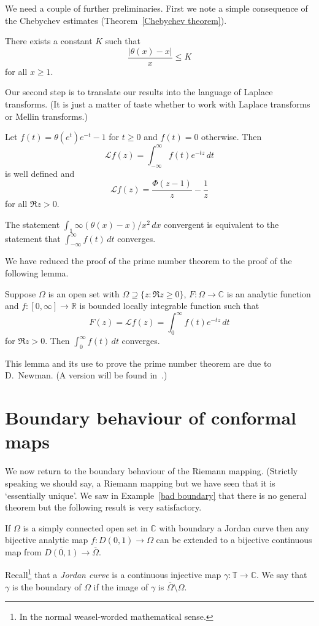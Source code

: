 We need a couple of further preliminaries.
First we note a simple consequence of the Chebychev
estimates (Theorem~\ref{Chebychev theorem}).
\begin{lemma} There exists a constant $K$
such that
\[\frac{|\theta(x)-x|}{x}\leq K\]
for all $x\geq 1$.
\end{lemma}
Our second step is to translate our results into
the language of Laplace transforms. (It is 
just a matter of taste whether to work with Laplace
transforms or Mellin transforms.)
\begin{lemma} Let $f(t)=\theta(e^{t})e^{-t}-1$ for
$t\geq 0$ and $f(t)=0$ otherwise. Then
\[\mathcal{L}f(z)=\int_{-\infty}^{\infty}f(t)e^{-tz}\,dt\]
is well defined and 
\[\mathcal{L}f(z)=\frac{\Phi(z-1)}{z}-\frac{1}{z}\]
for all $\Re z>0$.

The statement $\int_{1}{\infty}(\theta(x)-x)/x^{2}\,dx$
convergent is equivalent to the statement that
$\int_{-\infty}^{\infty}f(t)\,dt$ converges.
\end{lemma}

We have reduced the proof of the prime number theorem
to the proof of the following lemma.
\begin{lemma} Suppose $\Omega$ is an open set
with $\Omega\supseteq \{z:\Re z\geq 0\}$,
$F:\Omega\rightarrow{\mathbb C}$  is an analytic
function and $f:[0,\infty]\rightarrow{\mathbb R}$
is bounded locally integrable function such that
\[F(z)=\mathcal{L}f(z)=\int_{0}^{\infty}f(t)e^{-tz}\,dt\]
for $\Re z>0$. Then $\int_{0}^{\infty}f(t)\,dt$ converges.
\end{lemma}
This lemma and its use to prove the prime number theorem
are due to D.~Newman. (A version will be found in~\cite{Newman}.)

\section{Boundary behaviour of conformal maps}%
\label{Good boundary} 
We now return to the boundary behaviour
of the Riemann mapping. (Strictly speaking we should
say, a Riemann mapping but we have seen that it
is `essentially unique'. We saw in Example~\ref{bad boundary}
that there is no general theorem but the following result
is very satisfactory.
\begin{theorem}\label{Jordan boundary}
If $\Omega$ is a simply connected
open set in ${\mathbb C}$ with boundary a Jordan curve
then any bijective analytic map $f:D(0,1)\rightarrow \Omega$
can be extended to a bijective continuous map
from $\overline{D(0,1)}\rightarrow\overline{\Omega}$.
\end{theorem}
Recall\footnote{In the normal weasel-worded mathematical
sense.} that a \emph{Jordan curve} is
a continuous injective
map $\gamma:{\mathbb T}\rightarrow{\mathbb C}$.
We say that $\gamma$ is the boundary of $\Omega$
if the image of $\gamma$ is 
$\overline{\Omega}\setminus\Omega$.

